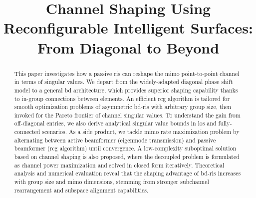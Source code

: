 \documentclass[journal]{IEEEtran}
\begin{document}
\title{Channel Shaping Using Reconfigurable Intelligent Surfaces: From Diagonal to Beyond}
\author{
}
\maketitle

\begin{abstract}
	This paper investigates how a passive \gls{ris} can reshape the \gls{mimo} point-to-point channel in terms of singular values.
	We depart from the widely-adapted diagonal phase shift model to a general \gls{bd} architecture, which provides superior shaping capability thanks to in-group connections between elements.
	An efficient \gls{rcg} algorithm is tailored for smooth optimization problems of asymmetric \gls{bd}-\gls{ris} with arbitrary group size, then invoked for the Pareto frontier of channel singular values.
	To understand the gain from off-diagonal entries, we also derive analytical singular value bounds in \gls{los} and fully-connected scenarios.
	As a side product, we tackle \gls{mimo} rate maximization problem by alternating between active beamformer (eigenmode transmission) and passive beamformer (\gls{rcg} algorithm) until convergence.
	A low-complexity suboptimal solution based on channel shaping is also proposed, where the decoupled problem is formulated as channel power maximization and solved in closed form iteratively.
	Theoretical analysis and numerical evaluation reveal that the shaping advantage of \gls{bd}-\gls{ris} increases with group size and \gls{mimo} dimensions, stemming from stronger subchannel rearrangement and subspace alignment capabilities.
\end{abstract}
\end{document}
